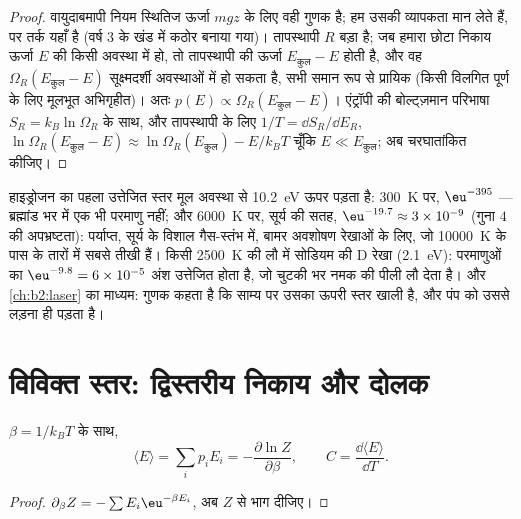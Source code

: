 \begin{proof}
वायुदाबमापी नियम स्थितिज ऊर्जा $mgz$ के लिए वही गुणक है; हम
उसकी व्यापकता मान लेते हैं, पर तर्क यहाँ है (वर्ष 3 के खंड में कठोर बनाया गया)।
तापस्थापी $R$ बड़ा है; जब हमारा छोटा निकाय
ऊर्जा $E$ की किसी अवस्था में हो, तो तापस्थापी की ऊर्जा $E_{\text{कुल}} -
E$ होती है, और वह $\Omega_R(E_{\text{कुल}} - E)$ सूक्ष्मदर्शी अवस्थाओं में हो सकता है, सभी
समान रूप से प्रायिक (किसी विलगित पूर्ण के लिए मूलभूत अभिगृहीत)। अतः
$p(E) \propto \Omega_R(E_{\text{कुल}} - E)$। एंट्रॉपी की बोल्ट्ज़मान परिभाषा
$S_R = k_B\ln\Omega_R$ के साथ, और तापस्थापी के लिए $1/T = \dd S_R/\dd E_R$,
$\ln\Omega_R(E_{\text{कुल}} - E) \approx \ln\Omega_R(E_{\text{कुल}})
- E/k_BT$ चूँकि $E \ll E_{\text{कुल}}$; अब चरघातांकित कीजिए।
\end{proof}

\begin{example}\label{ex:b2:boltzmann-factor:levels}
हाइड्रोजन का पहला उत्तेजित स्तर मूल अवस्था से \qty{10.2}{eV} ऊपर पड़ता है:
\qty{300}{K} पर, $\eu^{-395}$ --- ब्रह्मांड भर में एक भी परमाणु नहीं; और
\qty{6000}{K} पर, सूर्य की सतह, $\eu^{-19.7} \approx 3 \times 10^{-9}$ (गुना
$4$ की अपभ्रष्टता): पर्याप्त, सूर्य के विशाल गैस-स्तंभ में,
बामर अवशोषण रेखाओं के लिए, जो \qty{10000}{K} के पास के तारों में सबसे तीखी हैं।
किसी \qty{2500}{K} की लौ में सोडियम की D रेखा (\qty{2.1}{eV}): परमाणुओं का $\eu^{-9.8} = 6
\times 10^{-5}$ अंश उत्तेजित होता है, जो चुटकी भर नमक की पीली लौ
देता है। और \cref{ch:b2:laser} का  माध्यम: गुणक
कहता है कि साम्य पर उसका ऊपरी स्तर खाली है, और पंप को उससे लड़ना ही पड़ता है।
\end{example}

\section{विविक्त स्तर: द्विस्तरीय निकाय और दोलक}

\begin{proposition}[विभाजन फलन से माध्य ऊर्जा]\label{prop:b2:boltzmann-factor:meanE}
$\beta = 1/k_BT$ के साथ,
\[
\langle E\rangle = \sum_ip_iE_i = -\frac{\partial\ln Z}{\partial\beta}, \qquad
C = \frac{\dd\langle E\rangle}{\dd T} .
\]
\end{proposition}

\begin{proof}
$\partial_\beta Z = -\sum E_i\eu^{-\beta E_i}$, अब $Z$ से भाग दीजिए।
\end{proof}

